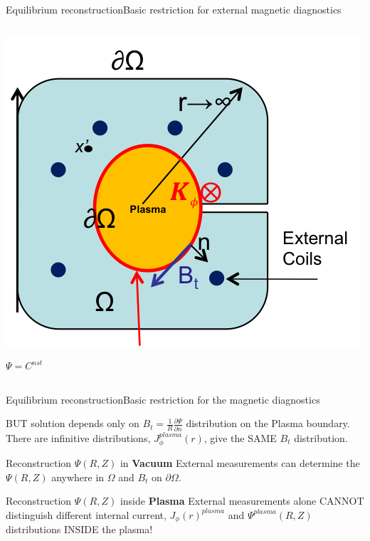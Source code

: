 \documentclass{beamer}
\begin{document}
\begin{frame}{Equilibrium reconstruction}{Basic restriction for  external  magnetic diagnostics }
\begin{columns}
   \begin{center}
 	\includegraphics[trim = 1mm 1mm 8mm 1mm, clip, width=.7\columnwidth]{xsection2.png}

	{ \color{red}   $ \Psi = C^{nst}$  }
   \end{center}
 \end{columns}

 \visible<3->{ \begin{block}{}%
Term 3 is the only one that depends on internal current, $J_{\phi}^{plasma}$.
\end{block}
}
 \end{frame}

 \begin{frame}{Equilibrium reconstruction}{Basic restriction for  the magnetic diagnostics }
 \begin{block}{}
BUT solution depends only on $B_t =  \frac{1}{ R}  \frac{\partial \Psi }{\partial n} $ distribution on the Plasma boundary.
There are infinitive distributions, $J_\phi^{plasma}(r)$, give the SAME  $B_t$ distribution.
\end{block}

 \begin{block}{Reconstruction $\Psi(R,Z)$ in \textbf{Vacuum}  \smiley }
 {
		External  measurements can determine the $\Psi(R,Z)$ anywhere in $\Omega$  and  $B_t$  on
	$\partial  \Omega$. ~~~  \smiley
}
\end{block}

 \begin{block}{Reconstruction $\Psi(R,Z)$ inside  \textbf{Plasma} \frownie  }
 {\color<2->{red}
	External  measurements alone  CANNOT distinguish  different internal current,
	$J_\phi(r)^{plasma}$ and $\Psi^{plasma}(R,Z)$ distributions INSIDE the plasma! \frownie
}
\end{block}
\end{frame}
\end{document}
